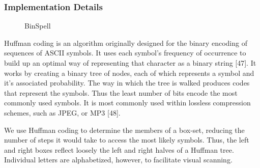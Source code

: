 \documentclass[12pt,titlepage]{article}
\begin{document}
\subsubsection{Implementation Details}

\begin{figure}
\centering
{}
\caption{BinSpell}
\label{fig:Bin}
\end{figure}

Huffman coding is an algorithm originally designed for the binary encoding of sequences of ASCII 
symbols.  It uses each symbol's frequency of occurrence to build up an optimal way of representing that 
character as a binary string [47].  It works by creating a binary tree of nodes, each of which represents a 
symbol and it's associated probability. The way in which the tree is walked produces codes that 
represent the symbols.  Thus the least number of bits encode the most commonly used symbols.  It is 
most commonly used within lossless compression schemes, such as JPEG, or MP3 [48].

We use Huffman coding to determine the members of a box-set,  reducing the number of steps it would 
take to access the most likely symbols.  Thus, the left and right boxes reflect loosely the left and right 
halves of a Huffman tree.  Individual letters are alphabetized, however, to facilitate visual scanning.
\end{document}
